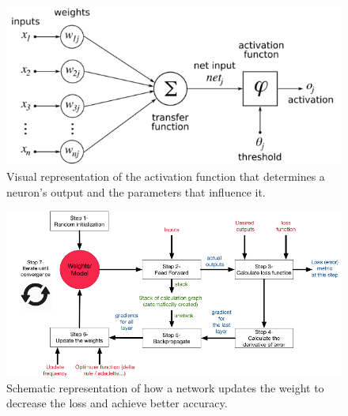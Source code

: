 \begin{figure}[htbp]
\begin{center}
\includegraphics[width=\textwidth]{immagini/pictures/neuron.png} 
\caption{Visual representation of the activation function that determines a neuron's output and the parameters that influence it.}
\end{center}
\end{figure}	

\begin{figure}[htbp]
\begin{center}
\includegraphics[width=\textwidth]{immagini/pictures/training.png} 
\caption{Schematic representation of how a network updates the weight to decrease the loss and achieve better accuracy.}
\end{center}
\end{figure}
	
